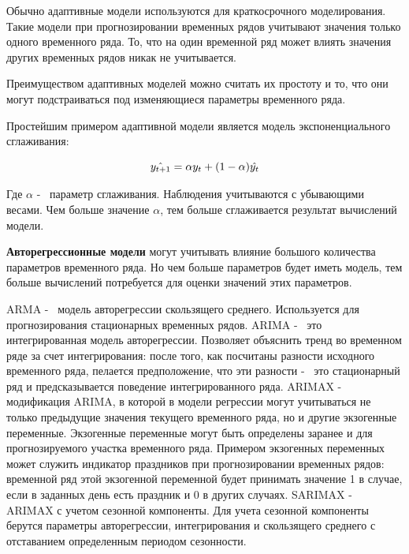 Обычно адаптивные модели используются для краткосрочного моделирования.
Такие модели при прогнозировании временных рядов учитывают значения только одного временного ряда.
То, что на один временной ряд может влиять значения других временных рядов никак не учитывается.

Преимуществом адаптивных моделей можно считать их простоту и то, что они могут подстраиваться
под изменяющиеся параметры временного ряда.

Простейшим примером адаптивной модели является модель экспоненциального сглаживания:

\begin{equation}\label{eq:exp_smoothing}
	\hat{y_{t+1}} = \alpha y_t + (1 - \alpha)\hat{y_t} \\
\end{equation}

\noindent Где $ \alpha $ -~ параметр сглаживания. Наблюдения учитываются с убывающими весами.
Чем больше значение $ \alpha $, тем больше сглаживается результат вычислений модели.


\textbf{Авторегрессионные модели} могут учитывать влияние большого количества параметров
временного ряда. Но чем больше параметров будет иметь модель, тем больше вычислений
потребуется для оценки значений этих параметров.

ARMA -~ модель авторегрессии скользящего среднего. Используется для прогнозирования
стационарных временных рядов.
ARIMA -~ это интегрированная модель авторегрессии. Позволяет объяснить тренд во временном
ряде за счет интегрирования: после того, как посчитаны разности исходного временного ряда,
пелается предположение, что эти разности -~ это стационарный ряд и предсказывается поведение
интегрированного ряда.
ARIMAX -~ модификация ARIMA, в которой в модели регрессии могут учитываться не только предыдущие значения
текущего временного ряда, но и другие экзогенные переменные. Экзогенные переменные могут быть определены
заранее и для прогнозируемого участка временного ряда. Примером экзогенных переменных может служить
индикатор праздников при прогнозировании временных рядов: временной ряд этой экзогенной переменной
будет принимать значение 1 в случае, если в заданных день есть праздник и 0 в других случаях.
SARIMAX -~ ARIMAX с учетом сезонной компоненты. Для учета сезонной компоненты
берутся параметры авторегрессии, интегрирования и скользящего среднего с отставанием
определенным периодом сезонности.

